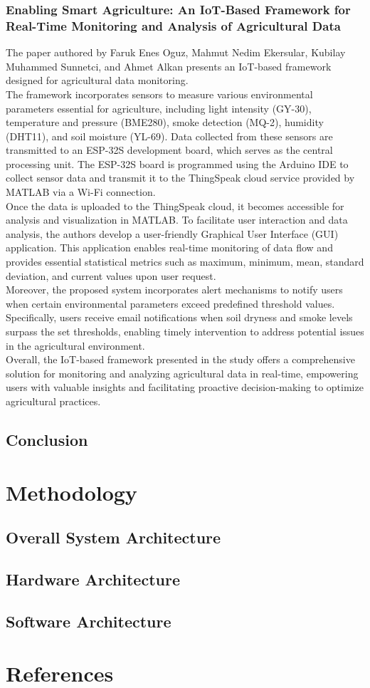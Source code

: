 \documentclass[12pt, a4paper]{article}
\begin{document}
\subsubsection{Enabling Smart Agriculture: An IoT-Based Framework for Real-Time Monitoring and Analysis of Agricultural Data}
The paper authored by Faruk Enes Oguz, Mahmut Nedim Ekersular, Kubilay Muhammed Sunnetci, and Ahmet Alkan \cite{oguz2024enabling} presents an IoT-based framework designed for agricultural data monitoring.\\
The framework incorporates sensors to measure various environmental parameters essential for agriculture, including light intensity (GY-30), temperature and pressure (BME280), smoke detection (MQ-2), humidity (DHT11), and soil moisture (YL-69). Data collected from these sensors are transmitted to an ESP-32S development board, which serves as the central processing unit. The ESP-32S board is programmed using the Arduino IDE to collect sensor data and transmit it to the ThingSpeak cloud service provided by MATLAB via a Wi-Fi connection.\\
Once the data is uploaded to the ThingSpeak cloud, it becomes accessible for analysis and visualization in MATLAB. To facilitate user interaction and data analysis, the authors develop a user-friendly Graphical User Interface (GUI) application. This application enables real-time monitoring of data flow and provides essential statistical metrics such as maximum, minimum, mean, standard deviation, and current values upon user request.\\
Moreover, the proposed system incorporates alert mechanisms to notify users when certain environmental parameters exceed predefined threshold values. Specifically, users receive email notifications when soil dryness and smoke levels surpass the set thresholds, enabling timely intervention to address potential issues in the agricultural environment.\\
Overall, the IoT-based framework presented in the study offers a comprehensive solution for monitoring and analyzing agricultural data in real-time, empowering users with valuable insights and facilitating proactive decision-making to optimize agricultural practices.

\subsection{Conclusion}
\newpage

\section{Methodology}
\subsection{Overall System Architecture}
\subsection{Hardware Architecture}
\subsection{Software Architecture}
\newpage

\section{References}


\end{document}
